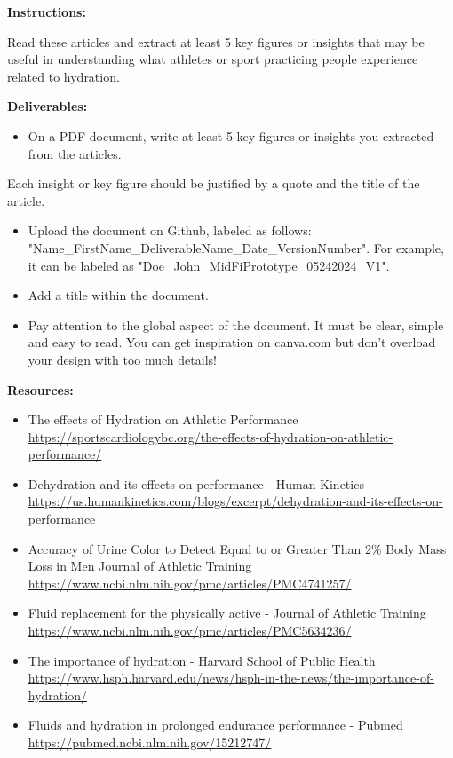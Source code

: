 \makeheaderfiles

\textbf{Instructions:}

Read these articles and extract at least 5 key figures or insights that may be useful in understanding what athletes or sport practicing people experience related to hydration.

\textbf{Deliverables:}

\begin{itemize}
\item On a PDF document, write at least 5 key figures or insights you extracted from the articles. 
\end{itemize}
Each insight or key figure should be justified by a quote and the title of the article.
\begin{itemize}
\item Upload the document on Github, labeled as follows: "Name\_FirstName\_DeliverableName\_Date\_VersionNumber". For example, it can be labeled as "Doe\_John\_MidFiPrototype\_05242024\_V1".
\item Add a title within the document.
\item Pay attention to the global aspect of the document. It must be clear, simple and easy to read. You can get inspiration on canva.com but don't overload your design with too much details!
\end{itemize}

\textbf{Resources:}

\begin{itemize}
\item The effects of Hydration on Athletic Performance \url{https://sportscardiologybc.org/the-effects-of-hydration-on-athletic-performance/}
\item Dehydration and its effects on performance - Human Kinetics \url{https://us.humankinetics.com/blogs/excerpt/dehydration-and-its-effects-on-performance}
\item Accuracy of Urine Color to Detect Equal to or Greater Than 2\% Body Mass Loss in Men Journal of Athletic Training \url{https://www.ncbi.nlm.nih.gov/pmc/articles/PMC4741257/}
\item Fluid replacement for the physically active - Journal of Athletic Training \url{https://www.ncbi.nlm.nih.gov/pmc/articles/PMC5634236/}
\item The importance of hydration - Harvard School of Public Health \url{https://www.hsph.harvard.edu/news/hsph-in-the-news/the-importance-of-hydration/}
\item Fluids and hydration in prolonged endurance performance - Pubmed \url{https://pubmed.ncbi.nlm.nih.gov/15212747/}
\end{itemize}

